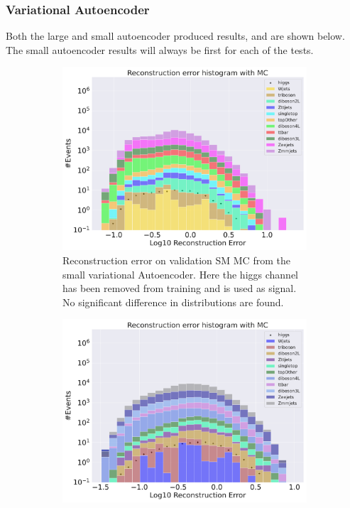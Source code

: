\subsubsection*{Variational Autoencoder}
Both the large and small autoencoder produced results, and are shown below. The small autoencoder results will always be first for each of the tests. 


\begin{figure}[h!]
    \centering
    \begin{subfigure}{.45\textwidth}
        \includegraphics[width=\textwidth]{Figures/VAE_testing/small/b_data_recon_big_rm3_feats_sig_higgs.pdf}
        \caption{Reconstruction error on validation SM MC from the small variational Autoencoder. Here the higgs channel has been removed from training and 
        is used as signal. No significant difference in distributions are found.}
        \label{fig:vae_small_higgs}
    \end{subfigure}
    \hfill 
    \begin{subfigure}{.45\textwidth}
        \includegraphics[width=\textwidth]{Figures/VAE_testing/big/b_data_recon_big_rm3_feats_sig_higgs.pdf}

\end{subfigure}
\end{figure}
